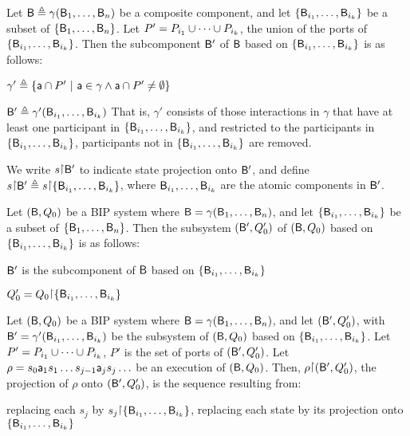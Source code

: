 \bd[Subcomponent]\label{def.bip.subcomponent} Let $\mathsf{B} \triangleq \gamma(\mathsf{B}_1,\dots,\mathsf{B}_n)$ be a composite component, and let $\{ \mathsf{B}_{i_1},\dots,\mathsf{B}_{i_k} \}$
be a subset of $\{ \mathsf{B}_{1},\dots,\mathsf{B}_{n} \}$.  Let $P' = P_{i_1} \cup \cdots \cup P_{i_k}$, \ie the union of the ports of $\{ \mathsf{B}_{i_1},\dots,\mathsf{B}_{i_k} \}$.
Then the subcomponent $\mathsf{B}'$ of $\mathsf{B}$ based on $\{ \mathsf{B}_{i_1},\dots,\mathsf{B}_{i_k} \}$ is as follows:
%
\bn
\item $\gamma' \triangleq \{  \mathsf{a} \cap P' ~|~ \mathsf{a} \in \gamma \land \mathsf{a} \cap P' \ne \emptyset \}$
\item $\mathsf{B}' \triangleq \gamma'(\mathsf{B}_{i_1},\dots,\mathsf{B}_{i_k})$ 
\en
\ed
That is, $\gamma'$ consists of those interactions in $\gamma$ that have at least one participant in 
$\{ \mathsf{B}_{i_1},\dots,\mathsf{B}_{i_k} \}$, and restricted to the participants in $\{ \mathsf{B}_{i_1},\dots,\mathsf{B}_{i_k} \}$,
\ie participants not in $\{ \mathsf{B}_{i_1},\dots,\mathsf{B}_{i_k} \}$ are removed.

We write $s \pj \B'$ to indicate state projection onto $\mathsf{B}'$, and define 
$s \pj \B' \df  s \pj \set{\B_{i_1}, \dots, \B_{i_k}}$, where $\mathsf{B}_{i_1},\dots,\mathsf{B}_{i_k}$ are the atomic
components in $\mathsf{B}'$.






\bd[Subsystem]\label{def.bip.subsystem}
Let $(\mathsf{B}, Q_0)$ be a BIP system where $\mathsf{B} = \gamma(\mathsf{B}_1,\dots,\mathsf{B}_n)$, and let 
$\{ \mathsf{B}_{i_1},\dots,\mathsf{B}_{i_k} \}$ be a subset of $\{ \mathsf{B}_{1},\dots,\mathsf{B}_{n} \}$.
Then the subsystem $(\mathsf{B}', Q'_0)$ of  $(\mathsf{B}, Q_0)$ based on $\{ \mathsf{B}_{i_1},\dots,\mathsf{B}_{i_k} \}$ is as follows:
\bn
\item $\mathsf{B}'$ is the subcomponent of $\mathsf{B}$ based on $\{ \mathsf{B}_{i_1},\dots,\mathsf{B}_{i_k} \}$ 
\item $Q'_0 = Q_0 \pj \set{\B_{i_1},\dots,\B_{i_k}}$
\en
\ed




\label{def.bip.execution.projection}
Let $(\mathsf{B}, Q_0)$ be a BIP system where $\mathsf{B} = \gamma(\mathsf{B}_1,\dots,\mathsf{B}_n)$, and let $(\mathsf{B}', Q'_0)$, with $\mathsf{B}'
= \gamma'(\mathsf{B}_{i_1},\dots,\mathsf{B}_{i_k})$ be the subsystem of $(\mathsf{B}, Q_0)$ based on $\{ \mathsf{B}_{i_1},\dots,\mathsf{B}_{i_k} \}$.
Let $P' = P_{i_1} \cup \cdots \cup P_{i_k}$, \ie $P'$ is the set of ports of $(\mathsf{B}', Q'_0)$.
%
Let $\rho = s_0 \mathsf{a}_1 s_1 \ldots s_{j-1} \mathsf{a}_j s_j \ldots$ be an execution of $(\mathsf{B}, Q_0)$.  Then, $\rho \pj (\B', Q'_0)$, the projection
of $\rho$ onto $(\mathsf{B}', Q'_0)$, is the sequence resulting from:
\bn
\item \label{def.clause.bip.execution.projection.state} 
replacing each $s_j$ by $s_j \pj \set{\B_{i_1},\dots,\B_{i_k}}$, \ie replacing each state by its projection onto $\{ \mathsf{B}_{i_1},\dots,\mathsf{B}_{i_k} \}$

